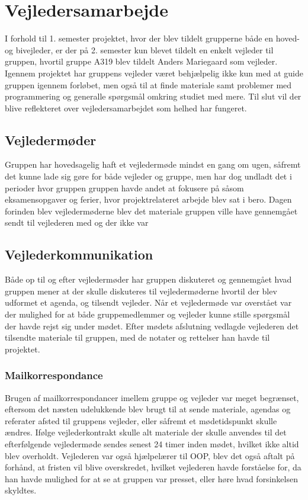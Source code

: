 \chapter{Vejledersamarbejde}\label{Vejldersamarbejde}
I forhold til 1. semester projektet, hvor der blev tildelt grupperne både en hoved- og bivejleder, er der på 2. semester kun blevet tildelt en enkelt vejleder til gruppen, hvortil gruppe A319 blev tildelt Anders Mariegaard som vejleder. Igennem projektet har gruppens vejleder været behjælpelig ikke kun med at guide gruppen igennem forløbet, men også til at finde materiale samt problemer med programmering og generalle spørgsmål omkring studiet med mere. Til slut vil der blive reflekteret over vejledersamarbejdet som helhed har fungeret.

\section{Vejledermøder}\label{Vejledermoeder}
Gruppen har hovedsagelig haft et vejledermøde mindst en gang om ugen, såfremt det kunne lade sig gøre for både vejleder og gruppe, men har dog undladt det i perioder hvor gruppen gruppen havde andet at fokusere på såsom eksamensopgaver og ferier, hvor projektrelateret arbejde blev sat i bero. Dagen forinden blev vejledermøderne blev det materiale gruppen ville have gennemgået sendt til vejlederen med og der ikke var 

\section{Vejlederkommunikation}\label{Vejlederkommunikation}
Både op til og efter vejledermøder har gruppen diskuteret og gennemgået hvad gruppen mener at der skulle diskuteres til vejledermøderne hvortil der blev udformet et agenda, og tilsendt vejleder. Når et vejledermøde var overstået var der mulighed for at både gruppemedlemmer og vejleder kunne stille spørgsmål der havde rejst sig under mødet. Efter mødets afslutning vedlagde vejlederen det tilsendte materiale til gruppen, med de notater og rettelser han havde til projektet. 


\subsection{Mailkorrespondance}\label{Mailkorrespondance}
Brugen af mailkorrespondancer imellem gruppe og vejleder var meget begrænset, eftersom det næsten udelukkende blev brugt til at sende materiale, agendas og referater afsted til gruppens vejleder, eller såfremt et mødetidspunkt skulle ændres. Ifølge vejlederkontrakt skulle alt materiale der skulle anvendes til det efterfølgende vejledermøde sendes senest 24 timer inden mødet, hvilket ikke altid blev overholdt. Vejlederen var også hjælpelærer til OOP, blev det også aftalt på forhånd, at fristen vil blive overskredet, hvilket vejlederen havde forståelse for, da han havde mulighed for at se at gruppen var presset, eller høre hvad forsinkelsen skyldtes.

